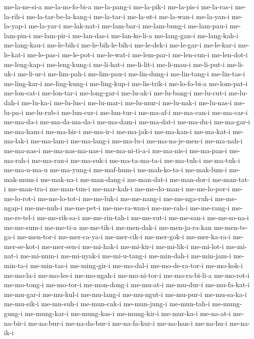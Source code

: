 {me-la-ne-si-a me-la-no-fo-bi-a me-la-pang-i me-la-pik-i me-la-pis-i
me-la-ras-i me-la-rih-i me-la-tar-be-la-kang-i me-la-tar-i me-la-ut-i
me-la-wan-i me-la-yan-i me-la-yap-i me-la-yar-i me-lak-nat-i me-lam-bar-i
me-lam-bung-i me-lam-pau-i me-lam-pin-i me-lam-pir-i me-lan-das-i
me-lan-ko-li-a me-lang-gan-i me-lang-kah-i me-lang-kau-i me-le-bih-i
me-le-bih-le-bih-i me-le-dek-i me-le-gar-i me-le-kar-i me-le-kat-i
me-le-pas-i me-le-pot-i me-le-wat-i me-lem-par-i me-len-cun-i me-len-dot-i
me-leng-kap-i me-leng-kung-i me-li-hat-i me-li-lit-i me-li-mau-i
me-li-put-i me-li-uk-i me-li-ur-i me-lim-pah-i me-lim-pau-i me-lin-dung-i
me-lin-tang-i me-lin-tas-i me-ling-kar-i me-ling-kung-i me-ling-kup-i
me-lis-trik-i me-lo-fo-bi-a me-lom-pat-i me-lon-cat-i me-lon-tar-i
me-long-gar-i me-lu-ak-i me-lu-bang-i me-lu-cut-i me-lu-dah-i me-lu-ka-i
me-lu-lus-i me-lu-mar-i me-lu-mur-i me-lu-nak-i me-lu-nas-i me-lu-pa-i
me-lu-rub-i me-lun-cur-i me-lun-tur-i me-ma-af-i me-ma-can-i me-ma-car-i
me-ma-da-i me-ma-da-ma-da-i me-ma-dam-i me-ma-dat-i me-ma-du-i me-ma-gar-i
me-ma-ham-i me-ma-hir-i me-ma-ir-i me-ma-jak-i me-ma-kan-i me-ma-kat-i
me-ma-lak-i me-ma-lam-i me-ma-lang-i me-ma-lu-i me-ma-na-je-men-i
me-ma-nah-i me-ma-nas-i me-ma-nas-ma-nas-i me-ma-ni-ti-a-i me-ma-nis-i
me-ma-pan-i me-ma-rah-i me-ma-ran-i me-ma-suk-i me-ma-ta-ma-ta-i
me-ma-tuh-i me-ma-tuk-i me-ma-u-ma-u me-ma-yung-i me-maf-hum-i
me-mah-ko-ta-i me-mak-lum-i me-mak-mum-i me-mak-na-i me-man-dang-i
me-man-dat-i me-man-dor-i me-man-tat-i me-man-tra-i me-man-tun-i
me-mar-kah-i me-me-do-man-i me-me-lo-por-i me-me-lo-rot-i me-me-lo-tot-i
me-me-luk-i me-me-nang-i me-me-nga-ruh-i me-me-ngap-i me-me-nuh-i
me-me-pet-i me-me-ra-wan-i me-me-rah-i me-me-rang-i me-me-re-tel-i
me-me-rik-sa-i me-me-rin-tah-i me-me-rut-i me-me-san-i me-me-so-na-i
me-me-sum-i me-me-ti-a me-me-tik-i me-men-dak-i me-men-ja-ra-kan
me-men-te-ga-i me-men-tor-i me-mer-ca-ya-i me-mer-cik-i me-mer-gok-i
me-mer-ka-ra-i me-mer-se-kot-i me-mer-sen-i me-mi-hak-i me-mi-kir-i
me-mi-lik-i me-mi-lot-i me-mi-nat-i me-mi-num-i me-mi-nyak-i
me-mi-u-tang-i me-min-dah-i me-min-jam-i me-min-ta-i me-min-tas-i
me-ming-gir-i me-mo-dal-i me-mo-de-ra-tor-i me-mo-kok-i me-mo-la-i
me-mo-les-i me-mo-ngah-i me-mo-ni-tor-i me-mo-ra-bi-li-a me-mo-rot-i
me-mo-tong-i me-mo-tor-i me-mon-dong-i me-mu-at-i me-mu-dur-i
me-mu-fa-kat-i me-mu-gar-i me-mu-kul-i me-mu-lang-i me-mu-ngut-i
me-mu-pur-i me-mu-sa-ka-i me-mu-sik-i me-mu-suh-i me-mun-cak-i
me-mun-jung-i me-mun-tah-i me-mung-gung-i me-mung-kar-i me-mung-kas-i
me-mung-kir-i me-mur-ka-i me-na-at-i me-na-bir-i me-na-bur-i
me-na-da-bur-i me-na-fa-kur-i me-na-han-i me-na-hu-i me-na-ik-i
}
